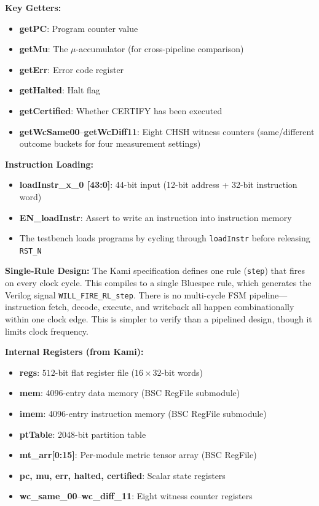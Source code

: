 \textbf{Key Getters:}
\begin{itemize}
    \item \textbf{getPC}: Program counter value
    \item \textbf{getMu}: The $\mu$-accumulator (for cross-pipeline comparison)
    \item \textbf{getErr}: Error code register
    \item \textbf{getHalted}: Halt flag
    \item \textbf{getCertified}: Whether CERTIFY has been executed
    \item \textbf{getWcSame00}--\textbf{getWcDiff11}: Eight CHSH witness counters (same/different outcome buckets for four measurement settings)
\end{itemize}

\textbf{Instruction Loading:}
\begin{itemize}
    \item \textbf{loadInstr\_x\_0 [43:0]}: 44-bit input (12-bit address + 32-bit instruction word)
    \item \textbf{EN\_loadInstr}: Assert to write an instruction into instruction memory
    \item The testbench loads programs by cycling through \texttt{loadInstr} before releasing \texttt{RST\_N}
\end{itemize}

\textbf{Single-Rule Design:} The Kami specification defines one rule (\texttt{step}) that fires on every clock cycle. This compiles to a single Bluespec rule, which generates the Verilog signal \texttt{WILL\_FIRE\_RL\_step}. There is no multi-cycle FSM pipeline---instruction fetch, decode, execute, and writeback all happen combinationally within one clock edge. This is simpler to verify than a pipelined design, though it limits clock frequency.

\textbf{Internal Registers (from Kami):}
\begin{itemize}
    \item \textbf{regs}: $512$-bit flat register file ($16 \times 32$-bit words)
    \item \textbf{mem}: 4096-entry data memory (BSC RegFile submodule)
    \item \textbf{imem}: 4096-entry instruction memory (BSC RegFile submodule)
    \item \textbf{ptTable}: 2048-bit partition table
    \item \textbf{mt\_arr[0:15]}: Per-module metric tensor array (BSC RegFile)
    \item \textbf{pc, mu, err, halted, certified}: Scalar state registers
    \item \textbf{wc\_same\_00}--\textbf{wc\_diff\_11}: Eight witness counter registers
\end{itemize}

